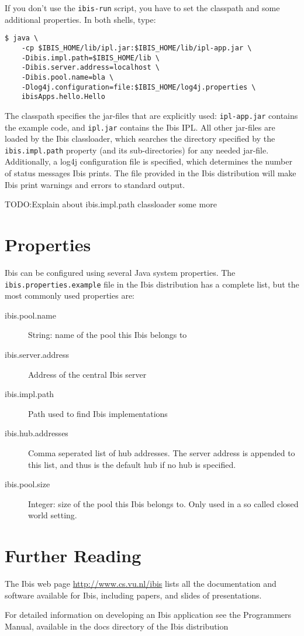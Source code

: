 \documentclass[10pt]{article}
\newcommand{\mysection}[1]{\section{#1}\label{#1}}
\begin{document}
If you don't use the \texttt{ibis-run} script, you have to set the classpath
and some additional properties. In both shells, type:

\noindent
{\small
\begin{verbatim}
$ java \
    -cp $IBIS_HOME/lib/ipl.jar:$IBIS_HOME/lib/ipl-app.jar \
    -Dibis.impl.path=$IBIS_HOME/lib \
    -Dibis.server.address=localhost \
    -Dibis.pool.name=bla \
    -Dlog4j.configuration=file:$IBIS_HOME/log4j.properties \
    ibisApps.hello.Hello
\end{verbatim}
}
\noindent
The classpath specifies the jar-files that are explicitly used:
\texttt{ipl-app.jar} contains the example code, and \texttt{ipl.jar} contains
the Ibis IPL. All other jar-files are loaded by the Ibis classloader, which
searches the directory specified by the \texttt{ibis.impl.path} property
(and its sub-directories) for any needed jar-file.
Additionally, a log4j configuration file is specified, which determines the
number of status messages Ibis prints. The file provided in the Ibis
distribution will make Ibis print
warnings and errors to standard output.

TODO:Explain about ibis.impl.path classloader some more

\mysection{Properties}

Ibis can be configured using several Java system properties. The
\texttt{ibis.properties.example} file in the Ibis distribution has a complete
list, but the most commonly used properties are:

\begin{description}

\item[ibis.pool.name] String: name of the pool this Ibis belongs to
\item[ibis.server.address] Address of the central Ibis server
\item[ibis.impl.path] Path used to find Ibis implementations
\item[ibis.hub.addresses] Comma seperated list of hub addresses. The
server address is appended to this list, and thus is the default hub if
no hub is specified.
\item[ibis.pool.size] Integer: size of the pool this Ibis belongs to.
Only used in a so called closed world setting.

\end{description}

\mysection{Further Reading}

The Ibis web page \url{http://www.cs.vu.nl/ibis} lists all
the documentation and software available for Ibis, including papers, and
slides of presentations.

For detailed information on developing an Ibis application see the
Programmers Manual, available in the docs directory of the Ibis
distribution
\end{document}
